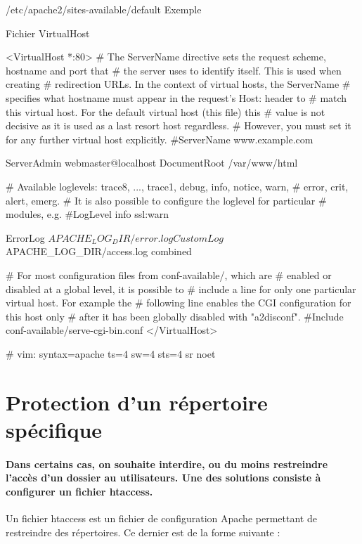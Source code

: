 /etc/apache2/sites-available/default
Exemple
\begin{Bash}{Fichier VirtualHost}


<VirtualHost *:80>
        # The ServerName directive sets the request scheme, hostname and port that
        # the server uses to identify itself. This is used when creating
        # redirection URLs. In the context of virtual hosts, the ServerName
        # specifies what hostname must appear in the request's Host: header to
        # match this virtual host. For the default virtual host (this file) this
        # value is not decisive as it is used as a last resort host regardless.
        # However, you must set it for any further virtual host explicitly.
        #ServerName www.example.com

        ServerAdmin webmaster@localhost
        DocumentRoot /var/www/html

        # Available loglevels: trace8, ..., trace1, debug, info, notice, warn,
        # error, crit, alert, emerg.
        # It is also possible to configure the loglevel for particular
        # modules, e.g.
        #LogLevel info ssl:warn

        ErrorLog ${APACHE_LOG_DIR}/error.log
        CustomLog ${APACHE_LOG_DIR}/access.log combined

        # For most configuration files from conf-available/, which are
        # enabled or disabled at a global level, it is possible to
        # include a line for only one particular virtual host. For example the
        # following line enables the CGI configuration for this host only
        # after it has been globally disabled with "a2disconf".
        #Include conf-available/serve-cgi-bin.conf
</VirtualHost>

# vim: syntax=apache ts=4 sw=4 sts=4 sr noet

\end{Bash}


\section{Protection d’un répertoire spécifique}

\paragraph{
Dans certains cas, on souhaite interdire, ou du moins restreindre l’accès d’un dossier au utilisateurs.
Une des solutions consiste à configurer un fichier htaccess. \newline
}
Un fichier htaccess est un fichier de configuration Apache permettant de restreindre des répertoires.
Ce dernier est de la forme suivante : \newline 


